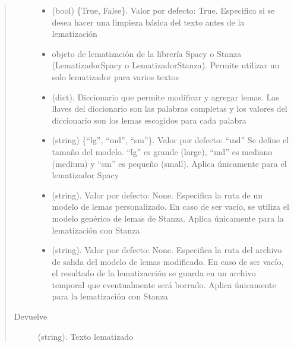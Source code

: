 \documentclass[letterpaper,10pt,openany,spanish]{sphinxmanual}
\begin{document}
\begin{fulllineitems}
\begin{quote}
\begin{description}
\begin{itemize}
\item {} 
 \textendash{} (bool) \{True, False\}. Valor por defecto: True. Especifica         si se desea hacer una limpieza básica del texto antes de la lematización

\item {} 
 \textendash{} objeto de lematización de la librería Spacy o Stanza         (LematizadorSpacy o LematizadorStanza). Permite utilizar un solo         lematizador para varios textos

\item {} 
 \textendash{} (dict). Diccionario que permite modificar y agregar         lemas. Las llaves del diccionario son las palabras completas y los         valores del diccionario son los lemas escogidos para cada palabra

\item {} 
 \textendash{} (string) \{“lg”, “md”, “sm”\}. Valor por defecto: “md”         Se define el tamaño del modelo. “lg” es grande (large), “md” es mediano         (medium) y “sm” es pequeño (small). Aplica únicamente para el lematizador         Spacy

\item {} 
 \textendash{} (string). Valor por defecto: None. Especifica la ruta         de un modelo de lemas personalizado. En caso de ser vacío, se utiliza         el modelo genérico de lemas de Stanza. Aplica únicamente para la         lematización con Stanza

\item {} 
 \textendash{} (string). Valor por defecto: None. Especifica la ruta         del archivo de salida del modelo de lemas modificado. En caso de ser         vacío, el resultado de la lematizacción se guarda en un archivo         temporal que eventualmente será borrado. Aplica únicamente para la         lematización con Stanza

\end{itemize}

\item[{Devuelve}] \leavevmode
(string). Texto lematizado

\end{description}\end{quote}

\end{fulllineitems}
\end{document}
